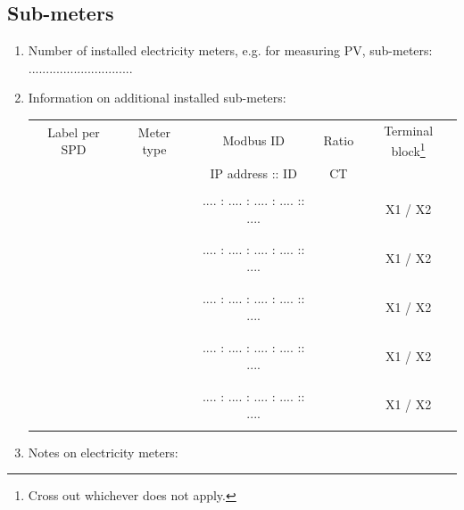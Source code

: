 {{        \subsection{Sub-meters}
        \begin{enumerate}[label=\alph*)]
            \item Number of installed electricity meters, e.g. for measuring PV, \newline sub-meters: \vskip0.1in \hfill \hfill ..............................
            \item Information on additional installed sub-meters:
            \vskip0.1in
            \begin{minipage}{\linewidth}
            \begin{tabular}{||c|c|c|c|c||}
            \hline
            Label per SPD & Meter type & Modbus ID & Ratio & Terminal block\footnote{Cross out whichever does not apply.}\\
             & &  IP address :: ID & CT & \\
            \hline
             & & & & \\
             & & .... : .... : .... : ....   :: .... & & X1 / X2\\
             & & & & \\
            \hline
             & & & & \\
             & & .... : .... : .... : ....   :: .... & & X1 / X2\\
             & & & & \\
            \hline
             & & & & \\
             & & .... : .... : .... : ....   :: .... & & X1 / X2\\
             & & & & \\
            \hline
             & & & & \\
             & & .... : .... : .... : ....   :: .... & & X1 / X2\\
             & & & & \\
            \hline
             & & & & \\
             & & .... : .... : .... : ....   :: .... & & X1 / X2\\
             & & & & \\
            \hline
            \end{tabular}
            \end{minipage}
            \item Notes on electricity meters:
            \begin{center}

\end{center}
\end{enumerate}}}
